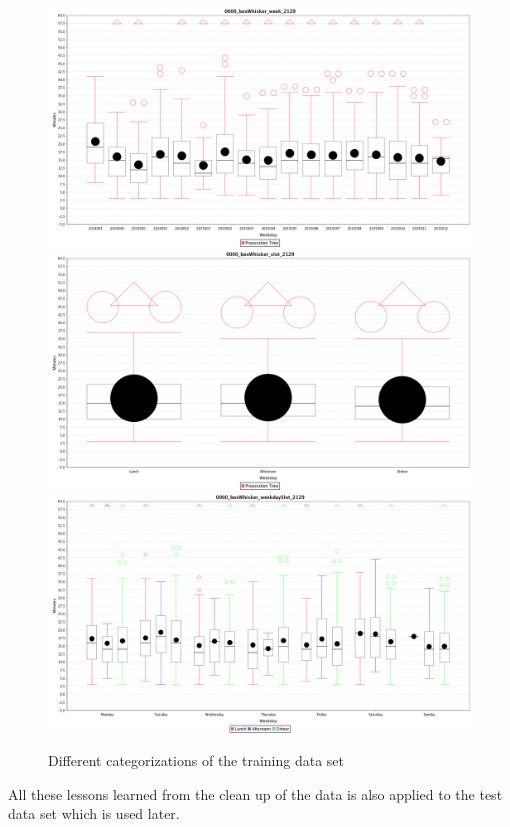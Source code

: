 \begin{figure}[htp]

\centering
\includegraphics[width=.3\textwidth]{images/0000_boxWhisker_week_2129.png}\hfill
\includegraphics[width=.3\textwidth]{images/0000_boxWhisker_slot_2129.png}\hfill
\includegraphics[width=.3\textwidth]{images/0000_boxWhisker_weekdaySlot_2129.png}

\caption{Different categorizations of the training data set}
\label{fig:triple_boxWhisker}

\end{figure}

All these lessons learned from the clean up of the data is also applied to the test data set which is used later.

